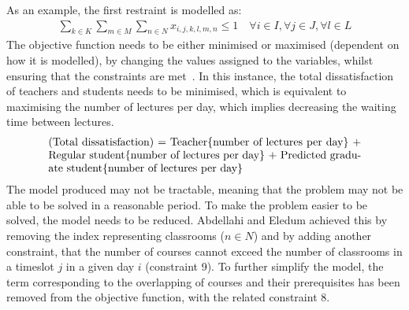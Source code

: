 As an example, the first restraint is modelled as:
\begin{align*}
	\sum_{k \in K} \sum_{m \in M} \sum_{n \in N} x_{i,j,k,l,m,n} \leq 1 \quad
	\forall i \in I, \forall j \in J, \forall l \in L
\end{align*}
The objective function needs to be either minimised or maximised (dependent on
how it is modelled), by changing the values assigned to the variables, whilst
ensuring that the constraints are met~\cite{objective_function}.
In this instance, the total dissatisfaction of teachers and students needs to be
minimised, which is equivalent to maximising the number of lectures per day,
which implies decreasing the waiting time between lectures.
\begin{align*}
	\parbox[t]{10cm}{(Total dissatisfaction) = Teacher\{number of lectures per
	day\} + Regular student\{number of lectures per day\} + Predicted graduate
	student\{number of lectures per day\}}
\end{align*}
The model produced may not be tractable, meaning that the problem may not be
able to be solved in a reasonable period.
To make the problem easier to be solved, the model needs to be reduced.
Abdellahi and Eledum achieved this by removing the index representing
classrooms (\( n\in N \)) and by adding another constraint, that the number of
courses cannot exceed the number of classrooms in a timeslot \( j \) in a given
day \( i \) (constraint 9).
To further simplify the model, the term corresponding to the overlapping of
courses and their prerequisites has been removed from the objective function,
with the related constraint 8.

